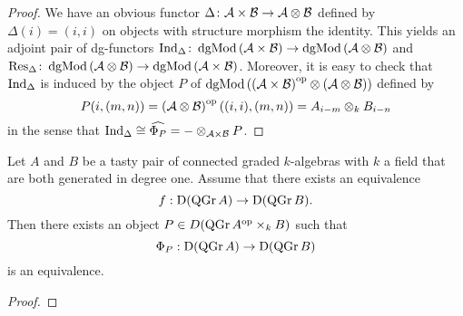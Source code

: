 \begin{proof}
  We have an obvious functor \(\Delta \colon \mathcal{A} \times \mathcal{B} \to \mathcal{A} \otimes \mathcal{B}\) defined by \(\Delta(i) = (i,i)\) on objects with structure morphism the identity.
  This yields an adjoint pair of dg-functors \(\operatorname{Ind}_{\Delta} \colon \operatorname{dgMod}\left(\mathcal{A} \times \mathcal{B}\right) \to \operatorname{dgMod}\left(\mathcal{A} \otimes \mathcal{B}\right)\) and \(\operatorname{Res}_{\Delta} \colon \operatorname{dgMod}\left(\mathcal{A} \otimes \mathcal{B}\right) \to \operatorname{dgMod}\left(\mathcal{A} \times \mathcal{B}\right)\).
  Moreover, it is easy to check that \(\operatorname{Ind}_{\Delta}\) is induced by the object \(P\) of \(\operatorname{dgMod}\left(\left(\mathcal{A} \times \mathcal{B}\right)^{\operatorname{op}} \otimes \left(\mathcal{A} \otimes \mathcal{B} \right)\right)\) defined by
  \[P(i,(m,n)) = \left(\mathcal{A} \otimes \mathcal{B}\right)^{\operatorname{op}}\left((i,i),(m,n)\right) = A_{i- m} \otimes_k B_{i - n}\]
  in the sense that \(\operatorname{Ind}_{\Delta} \cong \widehat{\Phi_P} = - \otimes_{\mathcal{A} \times \mathcal{B}} P\).
\end{proof}
\begin{corollary} \label{corollary: NCP morita degree 1}
  Let \(A\) and \(B\) be a tasty pair of connected graded \(k\)-algebras with \(k\) a field that are both generated in degree one.
  Assume that there exists an equivalence
  \begin{displaymath}
    f : \mathrm{D} (\operatorname{QGr}A) \to \mathrm{D} (\operatorname{QGr}B).
  \end{displaymath}
  Then there exists an object \(P \in D ( \operatorname{QGr}A^{\operatorname{op}} \times_k B )\) such that 
  \begin{displaymath}
    \Phi_P : \mathrm{D} ( \operatorname{QGr}A) \to \mathrm{D} (\operatorname{QGr}B )
  \end{displaymath}
  is an equivalence.
\end{corollary}

\begin{proof}
\end{proof}
